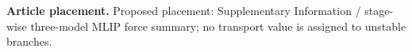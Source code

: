 \textbf{Article placement.} Proposed placement: Supplementary Information / stage-wise three-model MLIP force summary; no transport value is assigned to unstable branches.
